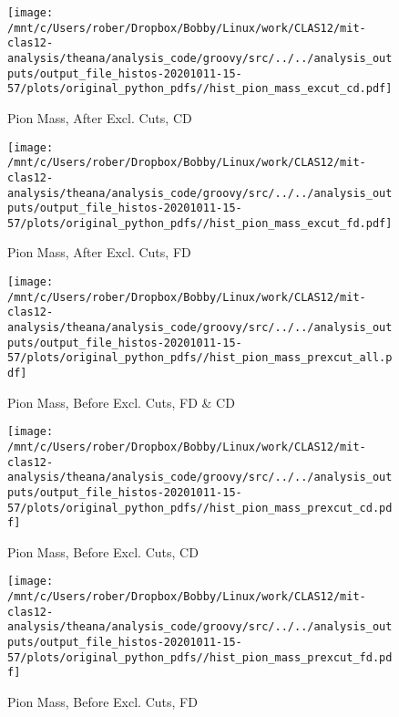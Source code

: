 \documentclass{article}
\begin{document}
\begin{landscape}
    \begin{figure}[h]
        \centering

        \texttt{[image: /mnt/c/Users/rober/Dropbox/Bobby/Linux/work/CLAS12/mit-clas12-analysis/theana/analysis\_code/groovy/src/../../analysis\_outputs/output\_file\_histos-20201011-15-57/plots/original\_python\_pdfs//hist\_pion\_mass\_excut\_cd.pdf]}
        \captionsetup{textformat=empty,labelformat=blank}
        \caption{Pion Mass, After Excl. Cuts, CD}
    \end{figure}
    \clearpage
    
    \begin{figure}[h]
        \centering

        \texttt{[image: /mnt/c/Users/rober/Dropbox/Bobby/Linux/work/CLAS12/mit-clas12-analysis/theana/analysis\_code/groovy/src/../../analysis\_outputs/output\_file\_histos-20201011-15-57/plots/original\_python\_pdfs//hist\_pion\_mass\_excut\_fd.pdf]}
        \captionsetup{textformat=empty,labelformat=blank}
        \caption{Pion Mass, After Excl. Cuts, FD}
    \end{figure}
    \clearpage
    
    \begin{figure}[h]
        \centering

        \texttt{[image: /mnt/c/Users/rober/Dropbox/Bobby/Linux/work/CLAS12/mit-clas12-analysis/theana/analysis\_code/groovy/src/../../analysis\_outputs/output\_file\_histos-20201011-15-57/plots/original\_python\_pdfs//hist\_pion\_mass\_prexcut\_all.pdf]}
        \captionsetup{textformat=empty,labelformat=blank}
        \caption{Pion Mass, Before Excl. Cuts, FD \& CD}
    \end{figure}
    \clearpage
    
    \begin{figure}[h]
        \centering

        \texttt{[image: /mnt/c/Users/rober/Dropbox/Bobby/Linux/work/CLAS12/mit-clas12-analysis/theana/analysis\_code/groovy/src/../../analysis\_outputs/output\_file\_histos-20201011-15-57/plots/original\_python\_pdfs//hist\_pion\_mass\_prexcut\_cd.pdf]}
        \captionsetup{textformat=empty,labelformat=blank}
        \caption{Pion Mass, Before Excl. Cuts, CD}
    \end{figure}
    \clearpage
    
    \begin{figure}[h]
        \centering

        \texttt{[image: /mnt/c/Users/rober/Dropbox/Bobby/Linux/work/CLAS12/mit-clas12-analysis/theana/analysis\_code/groovy/src/../../analysis\_outputs/output\_file\_histos-20201011-15-57/plots/original\_python\_pdfs//hist\_pion\_mass\_prexcut\_fd.pdf]}
        \captionsetup{textformat=empty,labelformat=blank}
        \caption{Pion Mass, Before Excl. Cuts, FD}
    \end{figure}
    \clearpage
    

\end{landscape}
\end{document}
